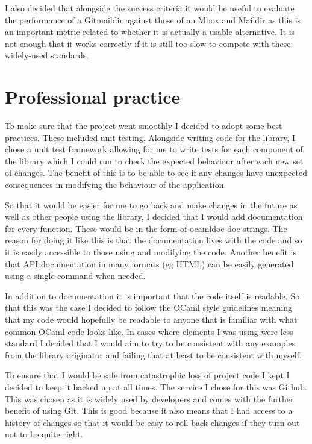 I also decided that alongside the success criteria it would be useful to evaluate the performance of a Gitmaildir against those of an Mbox and Maildir as this is an important metric related to whether it is actually a usable alternative. It is not enough that it works correctly if it is still too slow to compete with these widely-used standards.

\section{Professional practice}

To make sure that the project went smoothly I decided to adopt some best practices. These included unit testing. Alongside writing code for the library, I chose a unit test framework allowing for me to write tests for each component of the library which I could run to check the expected behaviour after each new set of changes. The benefit of this is to be able to see if any changes have unexpected consequences in modifying the behaviour of the application.

So that it would be easier for me to go back and make changes in the future as well as other people using the library, I decided that I would add documentation for every function. These would be in the form of ocamldoc doc strings. The reason for doing it like this is that the documentation lives with the code and so it is easily accessible to those using and modifying the code. Another benefit is that API documentation in many formats (eg HTML) can be easily generated using a single command when needed.

In addition to documentation it is important that the code itself is readable. So that this was the case I decided to follow the OCaml style guidelines\cite{ocaml_guidelines} meaning that my code would hopefully be readable to anyone that is familiar with what common OCaml code looks like. In cases where elements I was using were less standard I decided that I would aim to try to be consistent with any examples from the library originator and failing that at least to be consistent with myself.

To ensure that I would be safe from catastrophic loss of project code I kept I decided to keep it backed up at all times. The service I chose for this was Github. This was chosen as it is widely used by developers and comes with the further benefit of using Git. This is good because it also means that I had access to a history of changes so that it would be easy to roll back changes if they turn out not to be quite right.
